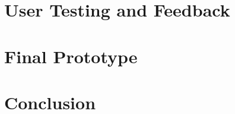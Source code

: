 \documentclass[runningheads]{llncs}
\begin{document}
\section{User Testing and Feedback} \label{sec:USER_TESTING}

\section{Final Prototype} \label{sec:FINAL_PROTOTYPE}





\section{Conclusion} \label{sec:CONCLUSION}



\end{document}
